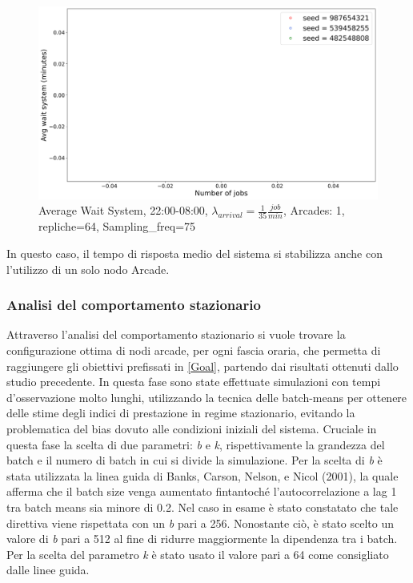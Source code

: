 \documentclass{article}
\begin{document}
\begin{figure}[H]
\centering
\captionsetup{justification=centering,margin=2cm}
\includegraphics[scale=0.48]{images/transient_night_s.png}
\caption{Average Wait System, 22:00-08:00, $\lambda_{arrival}=\frac{1}{35} \frac{job}{min}$, Arcades: 1, repliche=64, Sampling\_freq=75}\label{figura:avg_ws_night_s}
\end{figure}

In questo caso, il tempo di risposta medio del sistema si stabilizza anche con l'utilizzo di un solo nodo Arcade.

\subsubsection{Analisi del comportamento stazionario}
Attraverso l'analisi del comportamento stazionario si vuole trovare la configurazione ottima di nodi arcade, per ogni fascia oraria, che permetta di raggiungere gli obiettivi prefissati in \ref{Goal}, partendo dai risultati ottenuti dallo studio precedente.
In questa fase sono state effettuate simulazioni con tempi
d’osservazione molto lunghi, utilizzando la tecnica delle batch-means per ottenere delle stime degli indici di prestazione in regime stazionario, evitando la problematica del bias dovuto alle condizioni iniziali del sistema. Cruciale in questa fase la scelta di due parametri: \textit{b} e \textit{k}, rispettivamente la grandezza del batch e il numero di batch in cui si divide la simulazione. Per la scelta di \textit{b} è stata utilizzata la linea guida di Banks, Carson, Nelson, e Nicol (2001), la quale afferma che il batch size venga aumentato fintantoché l'autocorrelazione a lag 1 tra batch means sia minore di 0.2. Nel caso in esame è stato constatato che tale direttiva viene rispettata con un \textit{b} pari a 256. Nonostante ciò, è stato scelto un valore di \textit{b} pari a 512 al fine di ridurre maggiormente la dipendenza tra i batch.
Per la scelta del parametro \textit{k} è stato usato il valore pari a 64 come consigliato dalle linee guida.
\end{document}
